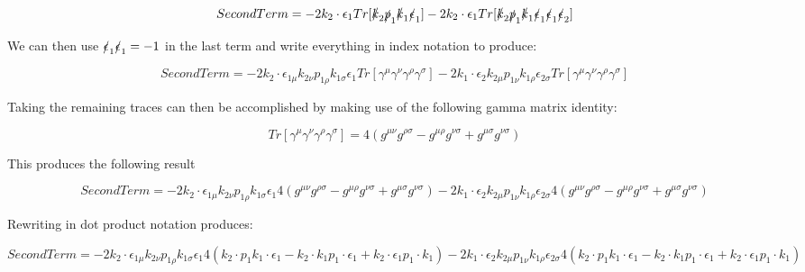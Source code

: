 \documentclass[a4]{article}
\begin{document}
    \begin{equation}
        Second Term = - 2 k_2 \cdot \epsilon_1 Tr [\slashed{k}_2 \slashed{p}_1 \slashed{k}_1 \slashed{\epsilon}_1] - 2 k_2 \cdot \epsilon_1 Tr [\slashed{k}_2 \slashed{p}_1 \slashed{k}_1 \slashed{\epsilon}_1 \slashed{\epsilon}_1 \slashed{\epsilon}_2]
    \end{equation}

    We can then use $\slashed{\epsilon}_1 \slashed{\epsilon}_1 = - 1$ in the last term and write everything in index notation to produce:

    \begin{equation}
        Second Term = - 2 k_2 \cdot \epsilon_{1 \mu} k_{2 \nu} p_{1 \rho} k_{1 \sigma} \epsilon_1 Tr [\gamma^\mu \gamma^\nu \gamma^\rho \gamma^\sigma] - 2 k_1 \cdot \epsilon_2 k_{2 \mu} p_{1 \nu} k_{1 \rho} \epsilon_{2 \sigma} Tr [\gamma^\mu \gamma^\nu \gamma^\rho \gamma^\sigma]
    \end{equation}

    Taking the remaining traces can then be accomplished by making use of the following gamma matrix identity:

    \begin{equation}
        Tr [\gamma^\mu \gamma^\nu \gamma^\rho \gamma^\sigma] = 4 (g^{\mu \nu} g^{\rho \sigma} - g^{\mu \rho} g^{\nu \sigma} + g^{\mu \sigma} g^{\nu \sigma})
    \end{equation}

    This produces the following result

    \begin{equation}
        Second Term = - 2 k_2 \cdot \epsilon_{1 \mu} k_{2 \nu} p_{1 \rho} k_{1 \sigma} \epsilon_1 4 (g^{\mu \nu} g^{\rho \sigma} - g^{\mu \rho} g^{\nu \sigma} + g^{\mu \sigma} g^{\nu \sigma}) - 2 k_1 \cdot \epsilon_2 k_{2 \mu} p_{1 \nu} k_{1 \rho} \epsilon_{2 \sigma} 4 (g^{\mu \nu} g^{\rho \sigma} - g^{\mu \rho} g^{\nu \sigma} + g^{\mu \sigma} g^{\nu \sigma})
    \end{equation}

    Rewriting in dot product notation produces:

    \begin{equation}
        Second Term = - 2 k_2 \cdot \epsilon_{1 \mu} k_{2 \nu} p_{1 \rho} k_{1 \sigma} \epsilon_1 4 (k_2 \cdot p_1 k_1 \cdot \epsilon_1 - k_2 \cdot k_1 p_1 \cdot \epsilon_1 + k_2 \cdot \epsilon_1 p_1 \cdot k_1) - 2 k_1 \cdot \epsilon_2 k_{2 \mu} p_{1 \nu} k_{1 \rho} \epsilon_{2 \sigma} 4 (k_2 \cdot p_1 k_1 \cdot \epsilon_1 - k_2 \cdot k_1 p_1 \cdot \epsilon_1 + k_2 \cdot \epsilon_1 p_1 \cdot k_1)
    \end{equation}
\end{document}
